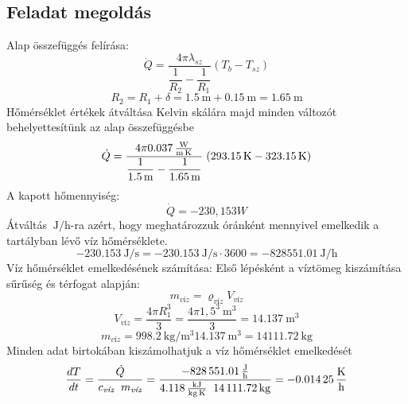\documentclass[12pt, a4paper, onecolumn]{article}
\begin{document}
\subsection*{Feladat megoldás}
Alap összefüggés felírása:
\begin{equation}
\dot{Q} =\dfrac{4 \pi  \lambda_{sz}}{\dfrac{1}{R_2} - \dfrac{1}{R_1}} (T_b-T_{sz}) 
\end{equation}
\begin{equation*}
 R_2=R_1+\delta=\SI{1,5}{\meter}+\SI{0,15}{\meter}=\SI{1,65}{\meter}
\end{equation*}
 Hőmérséklet értékek átváltása Kelvin skálára majd minden változót  behelyettesítünk az alap összefüggésbe 
\begin{equation}
\dot{Q}=\dfrac{4\pi\SI[per-mode=fraction]{0,037}{\watt\per\meter\per\kelvin}}
{\dfrac{1}{\SI{1,5}{\meter}}-\dfrac{1}{\SI{1,65}{\meter}}}
\hspace{1mm} (\SI{293,15}{\kelvin}-\SI{323,15}{\kelvin})
\end{equation}
A kapott hőmennyiség:
\begin{equation}
\dot{Q}=-230,153 W
\end{equation}
Átváltás $\SI[per-mode=fraction]{}{\J \per\hour}$-ra  azért, hogy meghatározzuk óránként mennyivel emelkedik a tartályban lévő víz hőmérséklete.
\begin{equation}
\SI[per-mode=fraction]{-230,153}{\J \per\second}=\SI[per-mode=fraction]{-230,153}{\J \per\second}\cdot 3600=\SI[per-mode=fraction]{-828551,01}{\J \per\hour}
\end{equation}
Víz hőmérséklet emelkedésének számítása:
Első lépésként a víztömeg kiszámítása sűrűség és térfogat alapján:
\begin{equation}
m_{\textit{víz}}=\varrho_{\textit{víz}} V_{\textit{víz}}
\end{equation}
\begin{equation}
V_{\textit{víz}}=\dfrac{4\pi R^3_1}{3}=\dfrac{4\pi 1,5^3\SI{}{\cubic \meter} }{3}=\SI{14,137}{\cubic \meter}
\end{equation}
\begin{equation}
m_{\textit{víz}}=\SI[per-mode=fraction]{998,2}{\kilogram\per\cubic\meter}\SI{14,137}{\cubic \meter} =\SI{14111,72}{\kg}
\end{equation}
Minden adat birtokában kiszámolhatjuk a víz hőmérséklet emelkedését
\begin{equation}
\dfrac{dT}{dt}=\dfrac{\dot{Q}}{c_{\textit{víz}} \hspace{2mm} m_{\textit{víz}}}=
\dfrac{\SI[per-mode=fraction]{-828551,01}{\J \per\hour}}{\SI[per-mode=fraction]{4,118}{\kJ \per \kilogram\per\kelvin} \hspace{2mm} \SI{14111,72}{\kg}}
=\SI[per-mode=fraction]{-0,01425}{\kelvin \per\hour}
\end{equation}
\end{document}
